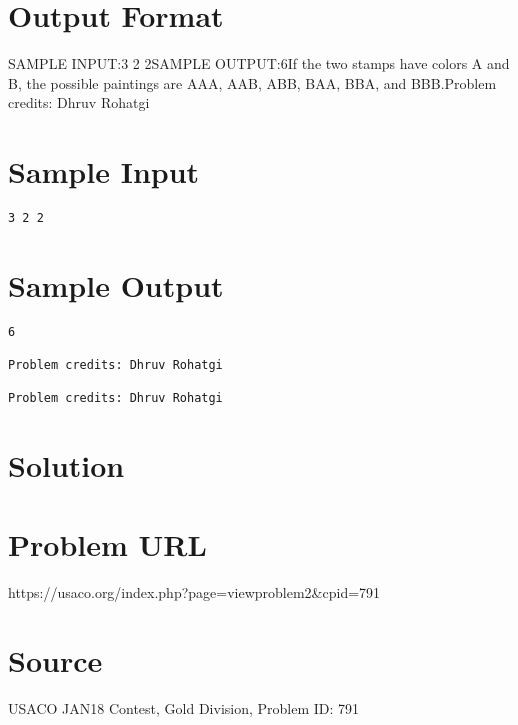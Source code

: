 \documentclass[12pt]{article}
\begin{document}
\section*{Output Format}
SAMPLE INPUT:3 2 2SAMPLE OUTPUT:6If the two stamps have colors A and B, the possible paintings are AAA, AAB, ABB,
BAA, BBA, and BBB.Problem credits: Dhruv Rohatgi

\section*{Sample Input}
\begin{verbatim}
3 2 2
\end{verbatim}

\section*{Sample Output}
\begin{verbatim}
6

Problem credits: Dhruv Rohatgi

Problem credits: Dhruv Rohatgi
\end{verbatim}

\section*{Solution}


\section*{Problem URL}
https://usaco.org/index.php?page=viewproblem2&cpid=791

\section*{Source}
USACO JAN18 Contest, Gold Division, Problem ID: 791
\end{document}
